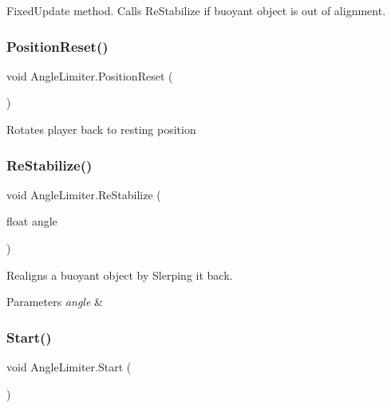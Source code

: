 Fixed\+Update method. Calls Re\+Stabilize if buoyant object is out of alignment. 

\mbox{\label{class_angle_limiter_a3a5ae25b493bc3057200370f827caf85}} 
\subsubsection{\texorpdfstring{Position\+Reset()}{PositionReset()}}
{\footnotesize\ttfamily void Angle\+Limiter.\+Position\+Reset (\begin{DoxyParamCaption}{ }\end{DoxyParamCaption})}



Rotates player back to resting position 

\mbox{\label{class_angle_limiter_afced607afbb55c3efcd949ee0e397b1a}} 
\subsubsection{\texorpdfstring{Re\+Stabilize()}{ReStabilize()}}
{\footnotesize\ttfamily void Angle\+Limiter.\+Re\+Stabilize (\begin{DoxyParamCaption}\item[{float}]{angle }\end{DoxyParamCaption})\hspace{0.3cm}{\ttfamily [private]}}



Realigns a buoyant object by Slerping it back. 


\begin{DoxyParams}{Parameters}
{\em angle} & \\
\hline
\end{DoxyParams}
\mbox{\label{class_angle_limiter_a89e574bae24693203bab055a3a4fd184}} 
\subsubsection{\texorpdfstring{Start()}{Start()}}
{\footnotesize\ttfamily void Angle\+Limiter.\+Start (\begin{DoxyParamCaption}{ }\end{DoxyParamCaption})\hspace{0.3cm}{\ttfamily [private]}}



